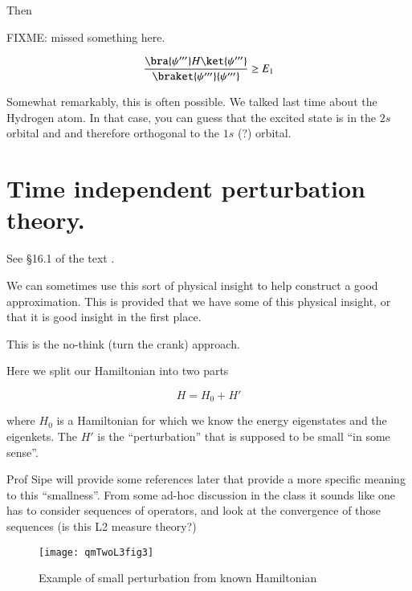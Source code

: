 
Then

FIXME: missed something here.

\begin{equation}\label{eqn:qmTwoL3:290}
\frac{
\bra{\psi'''} H \ket{\psi'''}
}
{
\braket{\psi'''}{\psi'''}
} 
\ge E_1
\end{equation}

Somewhat remarkably, this is often possible.  We talked last time about the Hydrogen atom.  In that case, you can guess that the excited state is in the $2s$ orbital and and therefore orthogonal to the $1s$ (?) orbital.  

\section{Time independent perturbation theory.}

See \S 16.1 of the text \cite{desai2009quantum}.

We can sometimes use this sort of physical insight to help construct a good approximation.  This is provided that we have some of this physical insight, or that it is good insight in the first place.

This is the no-think (turn the crank) approach.

Here we split our Hamiltonian into two parts

\begin{equation}\label{eqn:qmTwoL3:310}
H = H_0 + H'
\end{equation}

where $H_0$ is a Hamiltonian for which we know the energy eigenstates and the eigenkets.  The $H'$ is the ``perturbation'' that is supposed to be small ``in some sense''.

Prof Sipe will provide some references later that provide a more specific meaning to this ``smallness''.  From some ad-hoc discussion in the class it sounds like one has to consider sequences of operators, and look at the convergence of those sequences (is this L2 measure theory?)

\begin{figure}[htp]
\centering
\texttt{[image: qmTwoL3fig3]}
\caption{Example of small perturbation from known Hamiltonian}\label{fig:qmTwoL3:3}
\end{figure}


